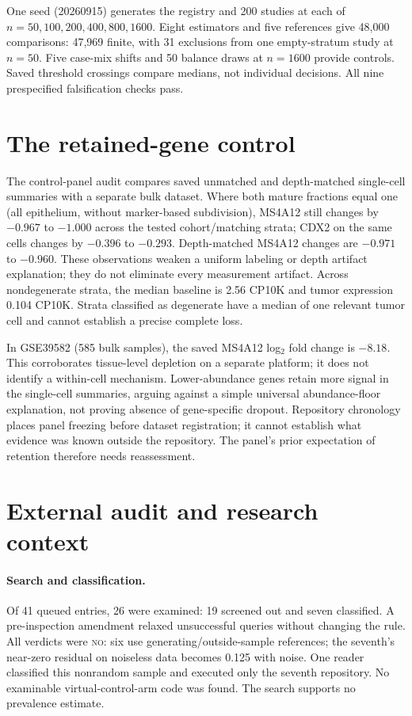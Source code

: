 One seed (20260915) generates the registry and 200 studies at each of
$n=50,100,200,400,800,1600$. Eight estimators and five references give
48{,}000 comparisons: 47{,}969 finite, with 31 exclusions from one empty-stratum
study at $n=50$. Five case-mix shifts and 50 balance draws at $n=1600$
provide controls. Saved threshold crossings compare medians, not individual
decisions. All nine prespecified falsification checks pass.

\section{The retained-gene control}
\label{app:controls}
The control-panel audit compares saved unmatched and depth-matched single-cell
summaries with a separate bulk dataset. Where both mature fractions equal
one (all epithelium, without marker-based subdivision), MS4A12 still changes
by $-0.967$ to $-1.000$ across the tested cohort/matching strata; CDX2 on the
same cells changes by $-0.396$ to $-0.293$. Depth-matched MS4A12 changes are
$-0.971$ to $-0.960$. These observations weaken a uniform labeling or depth
artifact explanation; they do not eliminate every measurement artifact.
Across nondegenerate strata, the median baseline is 2.56 CP10K and tumor
expression 0.104 CP10K. Strata classified as degenerate have a median of one
relevant tumor cell and cannot establish a precise complete loss.

In GSE39582 (585 bulk samples), the saved MS4A12 log$_2$ fold change is
$-8.18$. This corroborates tissue-level depletion on a separate platform;
it does not identify a within-cell mechanism. Lower-abundance genes retain
more signal in the single-cell summaries, arguing against a simple universal
abundance-floor explanation, not proving absence of gene-specific dropout.
Repository chronology places panel freezing before dataset registration;
it cannot establish what evidence was known outside the repository. The
panel's prior expectation of retention therefore needs reassessment.

\section{External audit and research context}
\label{app:prevalence}

\paragraph{Search and classification.}
Of 41 queued entries, 26 were examined: 19 screened out and seven classified.
A pre-inspection amendment relaxed unsuccessful queries without changing the
rule. All verdicts were \textsc{no}: six use generating/outside-sample references;
the seventh's near-zero residual on noiseless data becomes 0.125 with noise.
One reader classified this nonrandom sample and executed only the seventh
repository. No examinable virtual-control-arm code was found. The search
supports no prevalence estimate.

